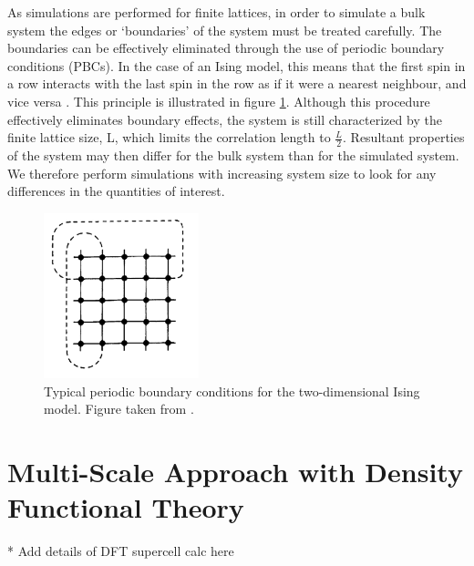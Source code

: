 As simulations are performed for finite lattices, in order to simulate a bulk system the edges or `boundaries' of the system must be treated carefully. The boundaries can be effectively eliminated through the use of periodic boundary conditions (PBCs). In the case of an Ising model, this means that the first spin in a row interacts with the last spin in the row as if it were a nearest neighbour, and vice versa \cite{MC_Landau}. This principle is illustrated in figure \ref{MC_PBCs}. Although this procedure effectively eliminates boundary effects, the system is still characterized by the finite lattice size, L, which limits the correlation length to $\frac{L}{2}$. Resultant properties of the system may then differ for the bulk system than for the simulated system. We therefore perform simulations with increasing system size to look for any differences in the quantities of interest.

\begin{figure}[h!]
  \centering
    \includegraphics[width=0.4\textwidth]{figures/MC_PBCs.png}
    \caption{Typical periodic boundary conditions for the two-dimensional Ising model. Figure taken from .}
  \label{MC_PBCs}
\end{figure}

\section{Multi-Scale Approach with Density Functional Theory}\label{MC_DFT}
* Add details of DFT supercell calc here\\

